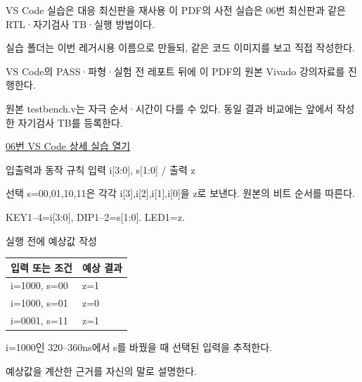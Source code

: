 \begin{frame}{VS Code 실습은 대응 최신판을 재사용}\relax
\small
이 PDF의 사전 실습은 06번 최신판과 같은 RTL·자기검사 TB·실행 방법이다.\par\vspace{0.22cm}실습 폴더는 이번 레거시용 이름으로 만들되, 같은 코드 이미지를 보고 직접 작성한다.\par\vspace{0.22cm}VS Code의 PASS·파형·실험 전 레포트 뒤에 이 PDF의 원본 Vivado 강의자료를 진행한다.\par\vspace{0.22cm}원본 testbench.v는 자극 순서·시간이 다를 수 있다. 동일 결과 비교에는 앞에서 작성한 자기검사 TB를 등록한다.\par\href{04.LAB1_06_MUX4TO1_VIVADO.pdf}{06번 VS Code 상세 실습 열기}
\end{frame}

\begin{frame}[label=legacy-06-sim]{입출력과 동작 규칙}\relax
\small
입력 i[3:0], s[1:0] / 출력 z\par\vspace{0.22cm}선택 s=00,01,10,11은 각각 i[3],i[2],i[1],i[0]을 z로 보낸다. 원본의 비트 순서를 따른다.\par\vspace{0.22cm}KEY1–4=i[3:0], DIP1–2=s[1:0]. LED1=z.\par
\end{frame}

\begin{frame}{실행 전에 예상값 작성}\relax
\small
\begin{center}\renewcommand{\arraystretch}{1.45}
\begin{tabular}{l|l}
입력 또는 조건 & 예상 결과\\\hline
i=1000, s=00 & z=1\\
i=1000, s=01 & z=0\\
i=0001, s=11 & z=1\\
\end{tabular}\end{center}
i=1000인 320–360ns에서 s를 바꿨을 때 선택된 입력을 추적한다.\par\vspace{0.22cm}예상값을 계산한 근거를 자신의 말로 설명한다.\par
\end{frame}

